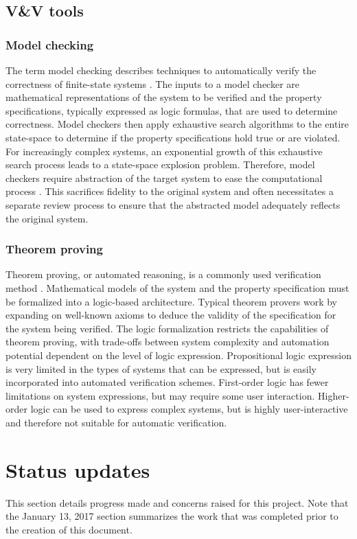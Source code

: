 \documentclass[12pt]{article}
\begin{document}
\subsection{V\&V tools}
\subsubsection{Model checking}
The term model checking describes techniques to automatically verify the correctness of finite-state systems \cite{Clarke1,Clarke2}. The inputs to a model checker are mathematical representations of the system to be verified and the property specifications, typically expressed as logic formulas, that are used to determine correctness. Model checkers then apply exhaustive search algorithms to the entire state-space to determine if the property specifications hold true or are violated. For increasingly complex systems, an exponential growth of this exhaustive search process leads to a state-space explosion problem. Therefore, model checkers require abstraction of the target system to ease the computational process \cite{Clarke3,Merz}. This sacrifices fidelity to the original system and often necessitates a separate review process to ensure that the abstracted model adequately reflects the original system. 


\subsubsection{Theorem proving}
Theorem proving, or automated reasoning, is a commonly used verification method \cite{Hasan,Harrison}. Mathematical models of the system and the property specification must be formalized into a logic-based architecture. Typical theorem provers work by expanding on well-known axioms to deduce the validity of the specification for the system being verified. The logic formalization restricts the capabilities of theorem proving, with trade-offs between system complexity and automation potential dependent on the level of logic expression. Propositional logic expression is very limited in the types of systems that can be expressed, but is easily incorporated into automated verification schemes. First-order logic has fewer limitations on system expressions, but may require some user interaction. Higher-order logic can be used to express complex systems, but is highly user-interactive and therefore not suitable for automatic verification.


\section{Status updates}
This section details progress made and concerns raised for this project. Note that the January 13, 2017 section summarizes the work that was completed prior to the creation of this document.
\end{document}
